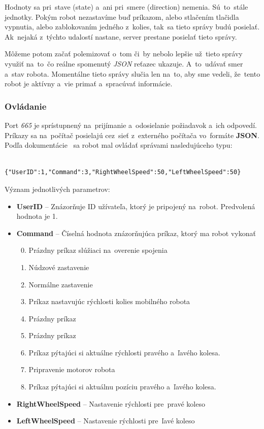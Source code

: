 	Hodnoty sa pri~stave (state) a~ani pri~smere (direction) nemenia. Sú~to~stále jednotky. Pokým robot nezastavíme
	buď príkazom, alebo stlačením tlačidla vypnutia, alebo zablokovaním jedného z~kolies, tak~sa tieto správy budú
	posielať. Ak~nejaká z~týchto udalostí nastane, server prestane posielať tieto správy.

	Môžeme potom začať polemizovať o~tom či~by nebolo lepšie už~tieto správy využiť na~to~čo reálne
	spomenutý \textit{JSON} reťazec ukazuje. A~to~udávať smer a~stav robota. Momentálne tieto správy slučia len na~to,
	aby sme vedeli, že~tento robot je aktívny a~vie primať a~spracúvať informácie.

\subsubsection{Ovládanie}
\label{sec:ovladanie}

	Port \textit{665} je sprístupnený na~prijímanie a~odosielanie požiadavok a~ich odpovedí. Príkazy sa na~počítač posielajú cez~sieť z~externého
	počítača vo~formáte \textbf{JSON}. Podľa dokumentácie~\cite{BMdoc} sa robot mal ovládať správami nasledujúceho typu:

	\label{jsonSpeedRequestBad}
	\begin{lstlisting}
			{"UserID":1,"Command":3,"RightWheelSpeed":50,"LeftWheelSpeed":50}
	\end{lstlisting}

	\noindent Význam jednotlivých parametrov:
	\begin{itemize}
		\item \textbf{UserID} -- Znázorňuje ID užívateľa, ktorý je pripojený na~robot. Predvolená hodnota je 1.
		\item \textbf{Command} --  Číselná hodnota znázorňujúca príkaz, ktorý ma robot vykonať
			\begin{enumerate}
				\setcounter{enumi}{-1}
				\item \label{c0} Prázdny príkaz slúžiaci na~overenie spojenia
				\item \label{c1} Núdzové zastavenie
				\item \label{c2} Normálne zastavenie
				\item \label{c3} Príkaz nastavujúc rýchlosti kolies mobilného robota
				\item \label{c4} Prázdny príkaz
				\item \label{c5} Prázdny príkaz
				\item \label{c6} Príkaz pýtajúci si aktuálne rýchlosti pravého a~ľavého kolesa.
				\item \label{c7} Pripravenie motorov robota
				\item \label{c8} Príkaz pýtajúci si aktuálnu pozíciu pravého a~ľavého kolesa.
			\end{enumerate}
		\item \textbf{RightWheelSpeed} -- Nastavenie rýchlosti pre~pravé koleso
		\item \textbf{LeftWheelSpeed} -- Nastavenie rýchlosti pre~ľavé koleso
	\end{itemize}


